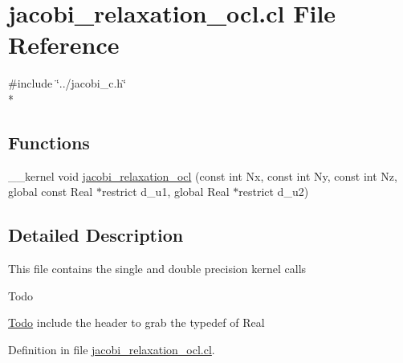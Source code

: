\hypertarget{jacobi__relaxation__ocl_8cl}{\section{jacobi\-\_\-relaxation\-\_\-ocl.\-cl File Reference}
\label{jacobi__relaxation__ocl_8cl}
}
{\ttfamily \#include \char`\"{}../jacobi\-\_\-c.\-h\char`\"{}}\\*
\subsection*{Functions}
\begin{DoxyCompactItemize}
\item 
\-\_\-\-\_\-kernel void \hyperlink{jacobi__relaxation__ocl_8cl_abb593e6f4b6801e78f82f4b26663fe06}{jacobi\-\_\-relaxation\-\_\-ocl} (const int Nx, const int Ny, const int Nz, global const Real $\ast$restrict d\-\_\-u1, global Real $\ast$restrict d\-\_\-u2)
\end{DoxyCompactItemize}


\subsection{Detailed Description}
This file contains the single and double precision kernel calls \begin{DoxyRefDesc}{Todo}
\item[\hyperlink{todo__todo000004}{Todo}]include the header to grab the typedef of Real \end{DoxyRefDesc}


Definition in file \hyperlink{jacobi__relaxation__ocl_8cl_source}{jacobi\-\_\-relaxation\-\_\-ocl.\-cl}.



